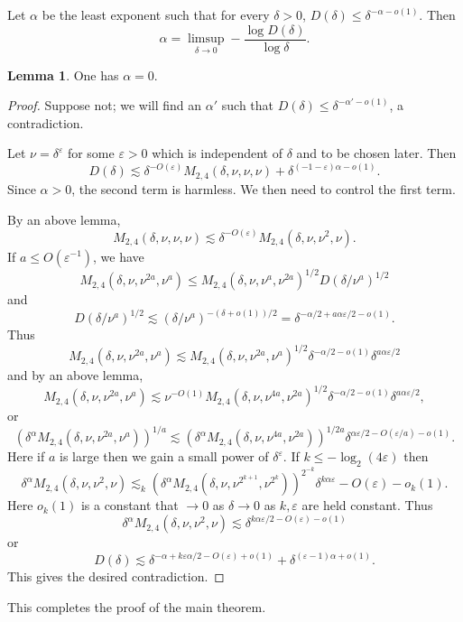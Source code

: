 \documentclass[12pt]{report}
\theoremstyle{definition}
\newtheorem{lemma}[theorem]{Lemma}
\begin{document}
Let $\alpha$ be the least exponent such that for every $\delta > 0$, $D(\delta) \leq \delta^{ - \alpha - o(1)}$.
Then
$$\alpha = \limsup_{\delta \to 0} - \frac{\log D(\delta)}{\log \delta}.$$
\begin{lemma}
One has $\alpha = 0$.
\end{lemma}
\begin{proof}
Suppose not; we will find an $\alpha'$ such that $D(\delta) \leq \delta^{ - \alpha' - o(1)}$, a contradiction.

Let $\nu = \delta^\varepsilon$ for some $\varepsilon > 0$ which is independent of $\delta$ and to be chosen later.
Then
$$D(\delta) \lesssim \delta^{-O(\varepsilon)} M_{2,4}(\delta, \nu, \nu, \nu) + \delta^{(-1-\varepsilon)\alpha - o(1)}.$$
Since $\alpha > 0$, the second term is harmless.
We then need to control the first term.

By an above lemma,
$$M_{2,4}(\delta, \nu, \nu, \nu) \lesssim \delta^{-O(\varepsilon)} M_{2,4}(\delta, \nu, \nu^2, \nu).$$
If $a \leq O(\varepsilon^{-1})$, we have
$$M_{2,4}(\delta, \nu, \nu^{2a}, \nu^a) \leq M_{2,4}(\delta, \nu, \nu^a, \nu^{2a})^{1/2} D(\delta/\nu^a)^{1/2}$$
and
$$D(\delta/\nu^a)^{1/2} \lesssim (\delta/\nu^a)^{-(\delta + o(1))/2} = \delta^{-\alpha/2 + a\alpha\varepsilon/2 - o(1)}.$$
Thus
$$M_{2,4}(\delta, \nu, \nu^{2a}, \nu^a) \lesssim M_{2,4}(\delta, \nu, \nu^{2a}, \nu^a)^{1/2} \delta^{-\alpha/2-o(1)} \delta^{a\alpha\varepsilon/2}$$
and by an above lemma,
$$M_{2,4}(\delta, \nu, \nu^{2a}, \nu^a) \lesssim \nu^{-O(1)} M_{2,4}(\delta, \nu, \nu^{4a}, \nu^{2a})^{1/2} \delta^{-\alpha/2-o(1)}\delta^{a\alpha\varepsilon/2},$$
or
$$(\delta^\alpha M_{2,4}(\delta, \nu, \nu^{2a}, \nu^a))^{1/a} \lesssim (\delta^\alpha M_{2,4}(\delta, \nu, \nu^{4a}, \nu^{2a}))^{1/2a} \delta^{\alpha\varepsilon/2-O(\varepsilon/a)-o(1)}.$$
Here if $a$ is large then we gain a small power of $\delta^\varepsilon$. If $k \leq -\log_2(4\varepsilon)$ then
$$\delta^\alpha M_{2,4}(\delta, \nu, \nu^2, \nu) \lesssim_k (\delta^\alpha M_{2,4}(\delta, \nu, \nu^{2^{k+1}}, \nu^{2^k}))^{2^{-k}} \delta^{k\alpha\varepsilon}-O(\varepsilon)-o_k(1).$$
Here $o_k(1)$ is a constant that $\to 0$ as $\delta \to 0$ as $k,\varepsilon$ are held constant.
Thus
$$\delta^\alpha M_{2,4}(\delta, \nu, \nu^2, \nu) \lesssim \delta^{k\alpha\varepsilon/2-O(\varepsilon)-o(1)}$$
or
$$D(\delta) \lesssim \delta^{-\alpha+k\varepsilon\alpha/2 - O(\varepsilon)+o(1)}+\delta^{(\varepsilon - 1)\alpha + o(1)}.$$
This gives the desired contradiction.
\end{proof}
This completes the proof of the main theorem.
\end{document}
